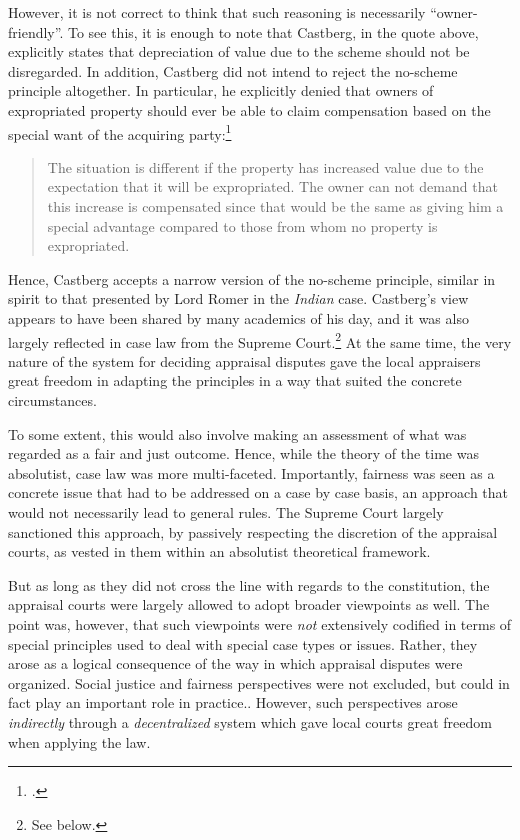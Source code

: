 However, it is not correct to think that such reasoning is necessarily ``owner-friendly''. To see this, it is enough to note that Castberg, in the quote above, explicitly states that depreciation of value due to the scheme should not be disregarded. In addition, Castberg did not intend to reject the no-scheme principle altogether. In particular, he explicitly denied that owners of expropriated property should ever be able to claim compensation based on the special want of the acquiring party:\footcite[268]{castberg64b}

\begin{quote}
The situation is different if the property has increased value due to the expectation that it will be expropriated. The owner can not demand that this increase is compensated since that would be the same as giving him a special advantage compared to those from whom no property is expropriated.
\end{quote}

Hence, Castberg accepts a narrow version of the no-scheme principle, similar in spirit to that presented by Lord Romer in the {\it Indian} case. Castberg's view appears to have been shared by many academics of his day, and it was also largely reflected in case law from the Supreme Court.\footnote{See below.} At the same time, the very nature of the system for deciding appraisal disputes gave the local appraisers great freedom in adapting the principles in a way that suited the concrete circumstances.

To some extent, this would also involve making an assessment of what was regarded as a fair and just outcome. Hence, while the theory of the time was absolutist, case law was more multi-faceted. Importantly, fairness was seen as a concrete issue that had to be addressed on a case by case basis, an approach that would not necessarily lead to general rules. The Supreme Court largely sanctioned this approach, by passively respecting the discretion of the appraisal courts, as vested in them within an absolutist theoretical framework.

But as long as they did not cross the line with regards to the constitution, the appraisal courts were largely allowed to adopt broader viewpoints as well. The point was, however, that such viewpoints were \emph{not} extensively codified in terms of special principles used to deal with special case types or issues. Rather, they arose as a logical consequence of the way in which appraisal disputes were organized. Social justice and fairness perspectives were not excluded, but could in fact play an important role in practice.. However, such perspectives arose \emph{indirectly} through a \emph{decentralized} system which gave local courts great freedom when applying the law.

